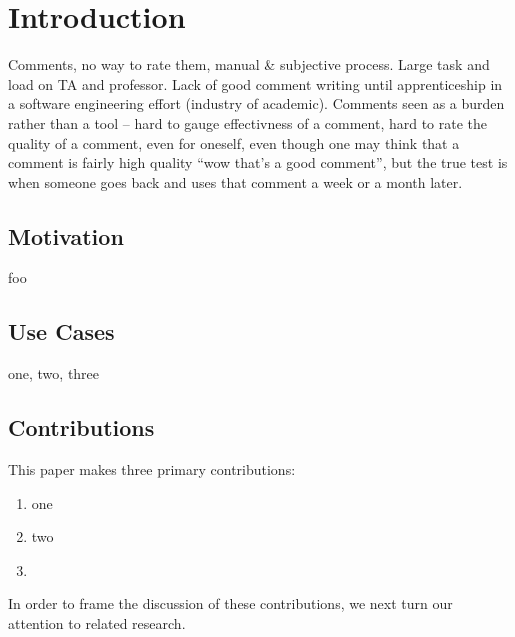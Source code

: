 \section{Introduction}
\label{sec:intro}

Comments, no way to rate them, manual & subjective process. Large task and
load on TA and professor. Lack of good comment writing until apprenticeship
in a software engineering effort (industry of academic). Comments seen as a
burden rather than a tool -- hard to gauge effectivness of a comment, hard
to rate the quality of a comment, even for oneself, even though one may
think that a comment is fairly high quality ``wow that's a good comment'',
but the true test is when someone goes back and uses that comment a week or
a month later.

\subsection{Motivation}

foo

\subsection{Use Cases}

one, two, three

\subsection{Contributions}

This paper makes three primary contributions:

\begin{enumerate}

  \item  one

  \item two

 \item 
\end{enumerate}

In order to frame the discussion of these contributions, we next turn our
attention to related research.
